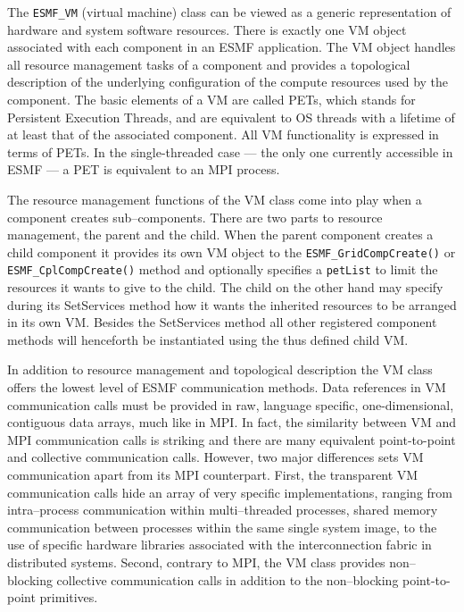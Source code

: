 
The {\tt ESMF\_VM} (virtual machine) class can be viewed as a generic representation of hardware and system software resources. There is exactly one VM object associated with each component in an ESMF application. The VM object handles all resource management tasks of a component and provides a topological description of the underlying configuration of the compute resources used by the component. The basic elements of a VM are called PETs, which stands for Persistent Execution Threads, and are equivalent to OS threads with a lifetime of at least that of the associated component. All VM functionality is expressed in terms of PETs. In the single-threaded case --- the only one currently accessible in ESMF --- a PET is equivalent to an MPI process. 

The resource management functions of the VM class come into play when a component creates sub--components. There are two parts to resource management, the parent and the child. When the parent component creates a child component it provides its own VM object to the {\tt ESMF\_GridCompCreate()} or {\tt ESMF\_CplCompCreate()} method and optionally specifies a {\tt petList} to limit the resources it wants to give to the child. The child on the other hand may specify during its SetServices method how it wants the inherited resources to be arranged in its own VM. Besides the SetServices method all other registered component methods will henceforth be instantiated using the thus defined child VM.

In addition to resource management and topological description the VM class offers the lowest level of ESMF communication methods. Data references in VM communication calls must be provided in raw, language specific, one-dimensional, contiguous data arrays, much like in MPI. In fact, the similarity between VM and MPI communication calls is striking and there are many equivalent point-to-point and collective communication calls. However, two major differences sets VM communication apart from its MPI counterpart. First, the transparent VM communication calls hide an array of very specific implementations, ranging from intra--process communication within multi--threaded processes, shared memory communication between processes within the same single system image, to the use of specific hardware libraries associated with the interconnection fabric in distributed systems. Second, contrary to MPI, the VM class provides non--blocking collective communication calls in addition to the non--blocking point-to-point primitives.


